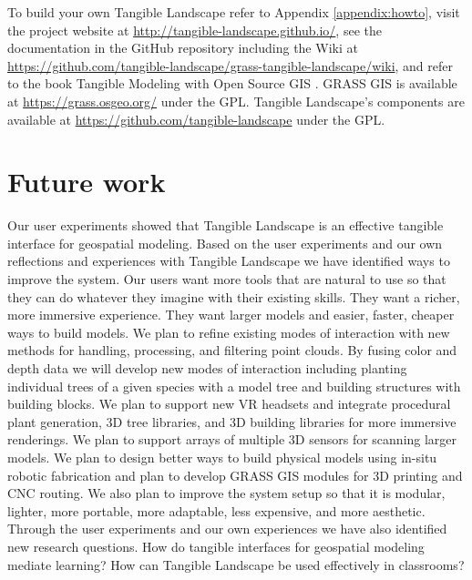 \documentclass[prodmode,acmtochi]{acmsmall} %
\begin{document}
To build your own Tangible Landscape
refer to Appendix \ref{appendix:howto},
visit the project website at \url{http://tangible-landscape.github.io/}, 
see the documentation in the GitHub repository 
including the Wiki at \url{https://github.com/tangible-landscape/grass-tangible-landscape/wiki},
and refer to the book Tangible Modeling with Open Source GIS \cite{Petrasova2015}.
GRASS GIS is available at
\url{https://grass.osgeo.org/} 
under the GPL. 
Tangible Landscape's components are available at
\url{https://github.com/tangible-landscape}
under the GPL. 

\section{Future work}
Our user experiments showed that Tangible Landscape is
an effective tangible interface for geospatial modeling. 
Based on the user experiments and 
our own reflections and experiences with Tangible Landscape
we have identified ways to improve the system.  
Our users want more tools that are natural to use 
so that they can do whatever they imagine
with their existing skills. 
They want a richer, more immersive experience. 
They want larger models and easier, faster, cheaper ways to build models.
We plan to 
refine existing modes of interaction 
with new methods for handling, processing, and filtering point clouds.
By fusing color and depth data
we will develop new modes of interaction including
planting individual trees of a given species with a model tree
and building structures with building blocks. 
We plan to support new VR headsets and integrate 
procedural plant generation, 3D tree libraries, and 3D building libraries
for more immersive renderings. 
We plan to support arrays of multiple 3D sensors
for scanning larger models.
We plan to design better ways to build physical models
using in-situ robotic fabrication
and plan to develop GRASS GIS modules 
for 3D printing and CNC routing. 
We also plan to improve the system setup
so that it is modular, lighter, more portable, more adaptable, less expensive,
and more aesthetic.
%
Through the user experiments 
and our own experiences
we have also identified new research questions.
How do tangible interfaces for geospatial modeling mediate learning?
How can Tangible Landscape be used effectively in classrooms?
\end{document}
